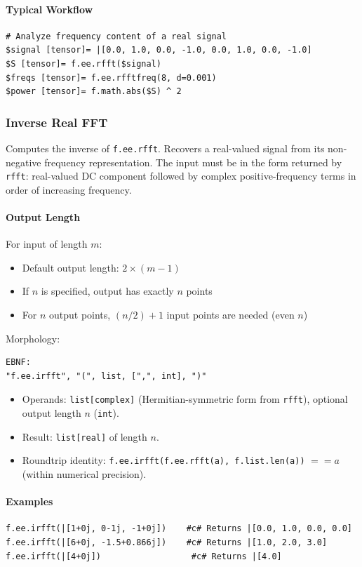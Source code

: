 \paragraph{Typical Workflow}
\begin{verbatim}
# Analyze frequency content of a real signal
$signal [tensor]= |[0.0, 1.0, 0.0, -1.0, 0.0, 1.0, 0.0, -1.0]
$S [tensor]= f.ee.rfft($signal)
$freqs [tensor]= f.ee.rfftfreq(8, d=0.001)
$power [tensor]= f.math.abs($S) ^ 2
\end{verbatim}

\subsubsection{Inverse Real FFT}
\label{sec:irfft}
Computes the inverse of \texttt{f.ee.rfft}. Recovers a real-valued signal from its non-negative frequency representation. The input must be in the form returned by \texttt{rfft}: real-valued DC component followed by complex positive-frequency terms in order of increasing frequency.

\paragraph{Output Length}
For input of length $m$:
\begin{itemize}
\item Default output length: $2 \times (m-1)$
\item If $n$ is specified, output has exactly $n$ points
\item For $n$ output points, $(n/2)+1$ input points are needed (even $n$)
\end{itemize}

Morphology:
\begin{verbatim}
EBNF:
"f.ee.irfft", "(", list, [",", int], ")"
\end{verbatim}
\begin{itemize}
\item Operands: \texttt{list[complex]} (Hermitian-symmetric form from \texttt{rfft}), optional output length $n$ (\texttt{int}).
\item Result: \texttt{list[real]} of length $n$.
\item Roundtrip identity: \texttt{f.ee.irfft(f.ee.rfft(a), f.list.len(a))} $== a$ (within numerical precision).
\end{itemize}

\paragraph{Examples}
\begin{verbatim}
f.ee.irfft(|[1+0j, 0-1j, -1+0j])    #c# Returns |[0.0, 1.0, 0.0, 0.0]
f.ee.irfft(|[6+0j, -1.5+0.866j])    #c# Returns |[1.0, 2.0, 3.0]
f.ee.irfft(|[4+0j])                  #c# Returns |[4.0]
\end{verbatim}


